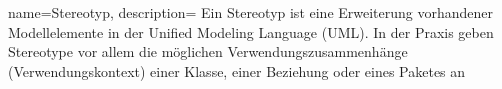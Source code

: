 {
  name=Stereotyp,
  description={
    Ein Stereotyp ist eine Erweiterung vorhandener Modellelemente in der Unified Modeling Language (UML). In der Praxis geben Stereotype vor allem die möglichen Verwendungszusammenhänge (Verwendungskontext) einer Klasse, einer Beziehung oder eines Paketes an
  }
}
